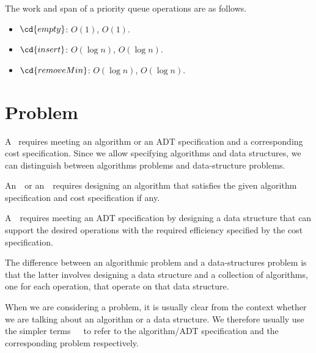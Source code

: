 %
\begin{costspec}
The work and span of a priority queue operations are as follows.
\begin{itemize}
\item $\cd{empty}$: $O(1)$, $O(1)$.
\item $\cd{insert}$: $O(\log{n})$, $O(\log{n})$.
\item $\cd{removeMin}$: $O(\log{n})$, $O(\log{n})$.
\end{itemize}
\end{costspec}

\section{Problem}

\begin{gram}
%
A~ requires meeting an algorithm or an ADT specification
and a corresponding cost specification.
%
Since we allow specifying algorithms and data structures, we can
distinguish between algorithms problems and data-structure problems.
%
\end{gram}

\begin{definition}
\label{def:intro::spec::algorithmic-problem}
An~~or an~~requires
designing an algorithm that satisfies the given algorithm
specification and cost specification if any.
%
\end{definition}

\begin{definition}
\label{def:intro::spec::ds-problem}

A~~requires meeting an ADT
specification by designing a data structure that can
support the desired operations with the required efficiency specified
by the cost specification.
%
\end{definition}

\begin{note}
The difference between an algorithmic problem and a data-structures
problem is that the latter involves designing a data structure and a
collection of algorithms, one for each operation, that operate on that
data structure.
\end{note}

\begin{remark}
When we are considering a problem, it is usually clear from the context whether we are talking about an algorithm or a data structure.
%
We therefore usually use the simpler terms~~~to refer to the algorithm/ADT specification and the corresponding problem respectively.
\end{remark}

